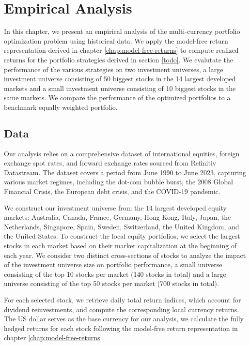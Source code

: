 \chapter{Empirical Analysis}

In this chapter, we present an empirical analysis of the multi-currency portfolio optimization problem using historical data. We apply the model-free return representation derived in chapter \ref{chap:model-free-returns} to compute realized returns for the portfolio strategies derived in section \ref{todo}. We evalutate the performance of the various strategies on two investment universes, a large investment universe consisting of 50 biggest stocks in the 14 largest developed markets and a small investment universe consisting of 10 biggest stocks in the same markets. We compare the performance of the optimized portfolios to a benchmark equally weighted portfolio. 

\section{Data}

Our analysis relies on a comprehensive dataset of international equities, foreign exchange spot rates, and forward exchange rates sourced from Refinitiv Datastream. The dataset covers a period from June 1990 to June 2023, capturing various market regimes, including the dot-com bubble burst, the 2008 Global Financial Crisis, the European debt crisis, and the COVID-19 pandemic. 

We construct our investment universe from the 14 largest developed equity markets: Australia, Canada, France, Germany, Hong Kong, Italy, Japan, the Netherlands, Singapore, Spain, Sweden, Switzerland, the United Kingdom, and the United States. To construct the local equity portfolios, we select the largest stocks in each market based on their market capitalization at the beginning of each year. We consider two distinct cross-sections of stocks to analyze the impact of the investment universe size on portfolio performance, a small universe consisting of the top 10 stocks per market (140 stocks in total) and a large universe consisting of the top 50 stocks per market (700 stocks in total). 

For each selected stock, we retrieve daily total return indices, which account for dividend reinvestments, and compute the corresponding local currency returns. The US dollar serves as the base currency for our analysis, we calculate the fully hedged returns for each stock following the model-free return representation in chapter \ref{chap:model-free-returns}.

